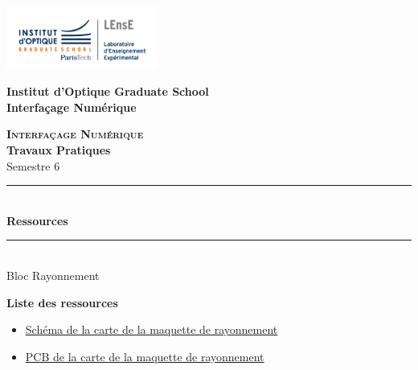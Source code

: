 \documentclass[a4paper,11pt,titlepage]{article} %
\begin{document}

\newpage
\begin{center}
	\begin{minipage}{2.5cm}
	\begin{center}
		\includegraphics[width=5cm]{images/Logo-LEnsE.png}
	\end{center}
\end{minipage}\hfill
\begin{minipage}{10cm}
	\begin{center}
	\textbf{Institut d'Optique Graduate School }\\[0.1cm]
    \textbf{Interfaçage Numérique}


	\end{center}
\end{minipage}\hfill


\vspace{2cm}


{\Large \bfseries \textsc{Interfaçage Numérique}} \\[0.5cm]
{\large \bfseries Travaux Pratiques} \\[0.2cm]
Semestre 6

\vspace{1cm}

\rule{\linewidth}{0.4mm} \\[0.4cm]
{ \Large \bfseries\color{violet_iogs} Ressources \\[0.4cm] }
\rule{\linewidth}{0.4mm} \\[1cm]
{\large Bloc Rayonnement}

\end{center}

\vspace{3cm}

\textbf{\large Liste des ressources}
\begin{itemize}
	\item \hyperref[doc:robot_schematic]{Schéma de la carte de la maquette de rayonnement}
	\item \hyperref[doc:robot_pcb]{PCB de la carte de la maquette de rayonnement}
\end{itemize}

\vfill
\end{document}

